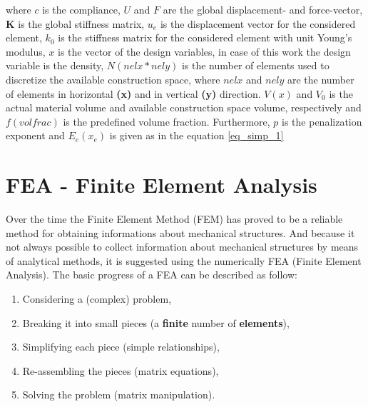 

where \textbf{$c$} is the compliance, \textbf{$U$} 
and \textbf{$F$} are the global displacement- and force-vector, \textbf{K} is the global stiffness matrix, \textbf{$u_e$} 
is the displacement vector for the considered element,
 \textbf{$k_0$} is the stiffness matrix for the considered
  element with unit Young's modulus,
   \textbf{$x$} is the vector of the design variables, in case of this work
   the design variable is the density, \textbf{$N (nelx*nely)$} is the number of elements used to discretize the available construction space, where \textbf{$nelx$} and \textbf{$nely$} are the number of elements in horizontal \textbf{(x)} and in vertical \textbf{(y)} direction. \textbf{$V(x)$} and \textbf{$V_0$} is the 
   actual material volume and available construction space volume, respectively and \textbf{$f(volfrac)$} is the predefined volume fraction.
Furthermore, \textbf{$p$} is the penalization exponent and \textbf{$E_e(x_e)$} is given as in the equation \ref{eq_simp_1}


 
\section{FEA - Finite Element Analysis}
\label{section_FEA}
Over the time the Finite Element Method (FEM) has proved to be a reliable method for obtaining informations about mechanical structures. And because it not always possible to collect information about mechanical structures by means of analytical methods, it is suggested using the numerically FEA (Finite Element Analysis). The basic progress of a FEA can be described as follow: 

\begin{enumerate}
\item{ Considering a (complex) problem},
\item{ Breaking it into small pieces (a \textbf{finite} number of \textbf{elements})},
\item{ Simplifying  each piece (simple relationships)}, 
\item {Re-assembling the pieces (matrix equations)},
\item {Solving the problem (matrix manipulation).}\\
\end{enumerate}

